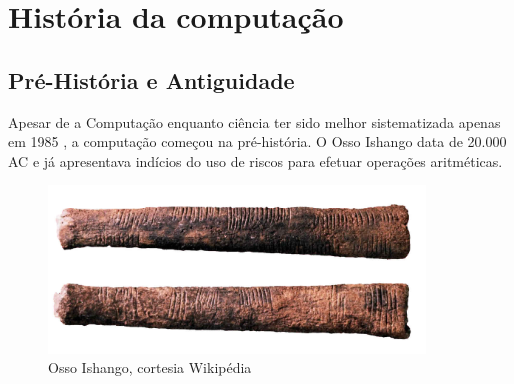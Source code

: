 \documentclass[brazil,times]{abnt}
\begin{document}






\capa

\folhaderosto

\tableofcontents

\chapter{História da computação}
\section{Pré-História e Antiguidade}
Apesar de a Computação enquanto ciência ter sido melhor sistematizada apenas
em 1985 \cite{computing-as-discipline}, a computação começou na pré-história. O
Osso Ishango data de 20.000 AC e já apresentava indícios do uso de riscos para efetuar operações
aritméticas. \cite{osso-ishango}

\begin{figure}[htp]
\begin{center}
  \includegraphics[width=100mm]{imagens/Ishango_bone.jpg}
  \caption[Osso Ishango, cortesia Wikipédia]{Osso Ishango, cortesia Wikipédia}
  \label{fig:osso-ishango}
\end{center}
\end{figure}
\end{document}
